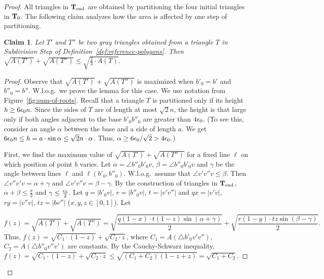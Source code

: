 \documentclass[11pt,english]{article}
\newtheorem{claim}[theorem]{Claim}
\numberwithin{figure}{section}
\newcommand{\Tend}{{\bf T}_{\text{end}}}
\newcommand{\Tstart}{{\bf T}_0}
\newcommand{\mch}[1]{{\color{black}#1}}
\begin{document}
\begin{proof}
All triangles in $\Tend$ are obtained by partitioning the four initial triangles in $\Tstart$. The following claim analyzes how the area is affected by one step of partitioning.
\begin{claim}\label{claim:sum-of-roots-of-areas}
Let $T'$ and $T''$ be two gray triangles obtained from a triangle $T$ in Subdivision Step of Definition~\ref{def:reference-polygons}. Then
$\sqrt{A(T')}+\sqrt{A(T'')}\leq \sqrt{\frac 2 3 \cdot A(T)}.$
\end{claim}

\begin{proof}
Observe that $\sqrt{A(T')}+\sqrt{A(T'')}$ is maximized when $b'_0=b'$ and $b''_0=b''$. W.l.o.g.\ we prove the lemma for this case. We use notation from Figure~\ref{fig:sum-of-roots}. Recall that a triangle $T$ is partitioned only if its height $h\geq 6{\epsilon_0} n.$ Since the sides of $T$ are of length at most $\sqrt 2 n$, the height is that large only if both angles adjacent to the base $b'_0b''_0$ are greater than $4{\epsilon_0}$. (To see this, consider an angle $\alpha$ between the base and a side of length $a$. We get
$6{\epsilon_0} n\leq h=a\cdot\sin\alpha\leq \sqrt 2 n \cdot \alpha$.
Thus, $\alpha\geq 6{\epsilon_0}/\sqrt 2> 4{\epsilon_0}.$)

First, we find the maximum value of $\sqrt{A(T')}+\sqrt{A(T'')}$ for a fixed line $\ell$ on which position of point $b$ varies. \mch{Let $\alpha=\angle b''_0b'_0v$, $\beta=\angle b''_0b'_0v$ and $\gamma$ be the angle between lines $\ell$ and $\ell(b'_0,b''_0)$. W.l.o.g.\ assume that $\angle v'v''v\leq \beta$. Then $\angle v''v'v=\alpha+\gamma$ and $\angle v'v''v=\beta-\gamma$. By the construction of triangles in $\Tend$, $\alpha+\beta\leq\frac{\pi}{2}$ and $\gamma\leq\frac {{\epsilon_0}} 2$. Let $q=|b'_0v|$, $r=|b''_0v|$, $t=|v'v''|$ and $qx=|v'v|$, $ry=|v''v|$, $tz=|bv''|$ ($x,y,z\in [0,1]$).}  Let\mch{
$$
f(z)=\sqrt{A(T')}+\sqrt{A(T'')}=\sqrt{\frac{q(1-x)\cdot t(1-z)\sin(\alpha+\gamma)}{2}}+\sqrt{\frac{r(1-y)\cdot tz\sin(\beta-\gamma)}{2}}.
$$
Thus, $f(z)=\sqrt{C_1\cdot(1-z)}+\sqrt{C_2\cdot z}$, where $C_1=A(\bigtriangleup b'_0v'v'')$, $C_2=A(\bigtriangleup b''_0v''v')$ are constants. By the  Cauchy-Schwarz inequality, $f(z)=\sqrt{C_1\cdot(1-z)}+\sqrt{C_2\cdot z}\leq\sqrt{(C_1+C_2)(1-z+z)}=\sqrt{C_1+C_2}$.

}
\end{proof}
\end{proof}
\end{document}
